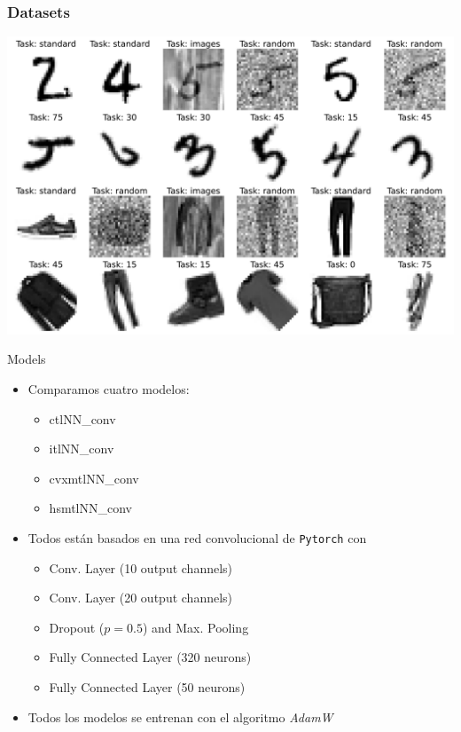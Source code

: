 \documentclass[aspectratio=43]{beamer}
\newcommand{\fmod}[1]{\textsf{#1}}
\begin{document}
\begin{frame}
      \frametitle{Datasets}
      \centering
      \includegraphics[width=.7\linewidth]{Chapter6/HAIS2022/hais22_datasets.pdf}

\end{frame}

\begin{frame}{Models}

      \begin{itemize}
          \item Comparamos cuatro modelos:
          \begin{itemize}
              \item \fmod{ctlNN\_conv}
              \item \fmod{itlNN\_conv}
              \item \fmod{cvxmtlNN\_conv}
              \item \fmod{hsmtlNN\_conv}
          \end{itemize}
          \item Todos están basados en una red convolucional de \texttt{Pytorch} con
          \begin{itemize}
              \item Conv. Layer (10 output channels)
              \item Conv. Layer (20 output channels)
              \item Dropout ($p=0.5$) and Max. Pooling
              \item Fully Connected Layer (320 neurons)
              \item Fully Connected Layer (50 neurons)
          \end{itemize}
          \item Todos los modelos se entrenan con el algoritmo \emph{AdamW}
      \end{itemize}
  
  \end{frame}
\end{document}
